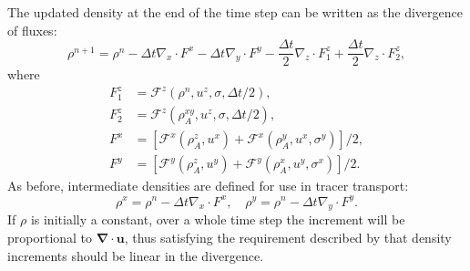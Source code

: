 \documentclass[11pt,a4paper]{article}
\begin{document}
The updated density at the end of the time step can be written as the divergence of fluxes:
\begin{equation}
    \rho^{n+1} = \rho^n - \Delta{t}\nabla_x \cdot F^x  - \Delta{t}\nabla_y \cdot F^y  - \frac{\Delta{t}}{2}\nabla_z \cdot F_1^z + \frac{\Delta{t}}{2}\nabla_z \cdot F_2^z,
\end{equation}
where
\begin{subequations}
\begin{align}
F_1^z & = \mathcal{F}^z(\rho^n,u^z,\sigma,\Delta{t}/2), \\
F_2^z & = \mathcal{F}^z(\rho^{xy}_A,u^z,\sigma,\Delta{t}/2), \\
F^x & = \left[ \mathcal{F}^x(\rho_A^z, u^x) + \mathcal{F}^x(\rho^y_A, u^x, \sigma^y) \right]/2, \\
F^y & = \left[ \mathcal{F}^y(\rho_A^z, u^y) + \mathcal{F}^y(\rho^x_A, u^y, \sigma^x)\right]/2.
\end{align}
\end{subequations}
As before, intermediate densities are defined for use in tracer transport:
\begin{equation}
\rho^x = \rho^{n} - \Delta{t} \nabla_x\cdot F^x, \quad
\rho^y = \rho^{n} - \Delta{t} \nabla_y\cdot F^y. 
\end{equation}
If $\rho$ is initially a constant, over a whole time step the increment will be proportional to $\bm{\nabla\cdot u}$, thus satisfying the requirement described by \citet{melvin2024mixed} that density increments should be linear in the divergence.
\end{document}
